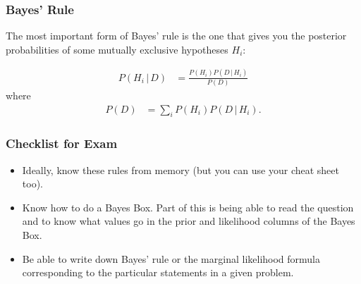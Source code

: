 \documentclass{beamer}
\newcommand{\given}{\,|\,}
\begin{document}
\begin{frame}
\frametitle{Bayes' Rule}
The most important form of Bayes' rule is the one that gives you the
posterior probabilities of some mutually exclusive hypotheses $H_i$:

\begin{align}
P(H_i \given D) &= \frac{P(H_i)P(D \given H_i)}{P(D)}
\end{align} \pause
where
\begin{align}
P(D) &= \sum_i P(H_i) P(D \given H_i).
\end{align}


\end{frame}


\begin{frame}
\frametitle{Checklist for Exam}

\begin{itemize}
\item Ideally, know these rules from memory (but you can use your cheat sheet
too).\pause
\item Know how to do a Bayes Box. Part of this is being able to read the
question and to know what values go in the prior
and likelihood columns of the Bayes Box.\pause
\item Be able to write down Bayes' rule or the marginal likelihood formula
corresponding to the particular statements in a given problem.
\end{itemize}


\end{frame}
\end{document}
